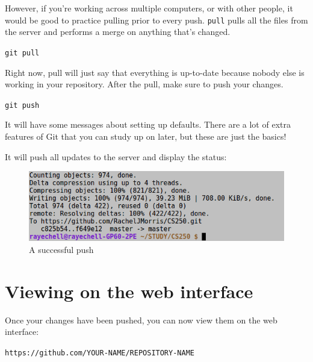 \documentclass[a4paper,12pt,oneside]{book}
\begin{document}
        However, if you're working across multiple computers, or with other people,
        it would be good to practice pulling prior to every push.
        \texttt{pull} pulls all the files from the server and performs
        a merge on anything that's changed.

        \begin{center}
            \texttt{git pull}
        \end{center}

        Right now, pull will just say that everything is up-to-date
        because nobody else is working in your repository. After the
        pull, make sure to push your changes.

        \begin{center}
            \texttt{git push}
        \end{center}

        It will have some messages about setting up defaults. There are
        a lot of extra features of Git that you can study up on later,
        but these are just the basics!

        It will push all updates to the server and display the status:
        
        \begin{figure}[h]
            \centering
            \includegraphics[width=14cm]{images/git-pushed.png}
            \caption{A successful push}
        \end{figure}
        
    \newpage

    \section{Viewing on the web interface}

        Once your changes have been pushed, you can now view them on the
        web interface:

        \begin{center}
        \texttt{https://github.com/YOUR-NAME/REPOSITORY-NAME}
        \end{center}
        
\end{document}
